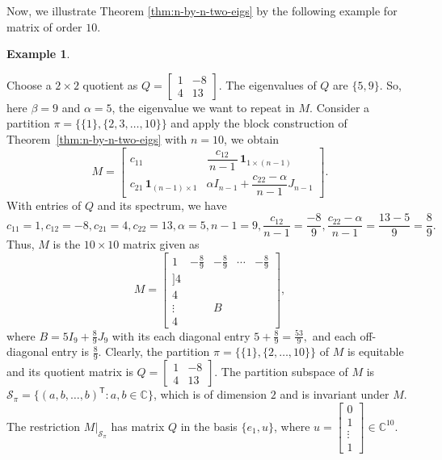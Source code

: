 \documentclass[12pt,twoside]{article}
\newtheorem{example}[theorem]{Example}
\begin{document}
Now, we illustrate Theorem \ref{thm:n-by-n-two-eigs} by the following example for matrix of order $10.$
\begin{example}\label{ex:n10-two-eigs}\end{example}
	Choose a $2\times 2$ quotient as $Q=
	\begin{bmatrix}
		1 & -8\\
		4 & 13
	\end{bmatrix}.$ The eigenvalues of $Q$ are $\{5,9\}.$ So, here $\beta=9$ and  $\alpha=5$, the eigenvalue we want to repeat in $M$.  Consider a  partition $	\pi=\bigl\{\{1\},\{2,3,\dots,10\}\bigr\}$ 	and apply the block construction of Theorem~\ref{thm:n-by-n-two-eigs} with $n=10$, we obtain
	$$
	M
	=
	\begin{bmatrix}
		c_{11} & \dfrac{c_{12}}{\,n-1\,}\,\mathbf{1}_{1\times (n-1)}\\
		c_{21}\,\mathbf{1}_{(n-1)\times 1} & \alpha I_{n-1} + \dfrac{c_{22}-\alpha}{\,n-1\,}J_{n-1}
	\end{bmatrix}.
	$$
	With entries of $Q$ and its spectrum, we have
	$$
	c_{11}=1,  c_{12}=-8,  c_{21}=4,  c_{22}=13,  \alpha=5,  n-1=9, \frac{c_{12}}{n-1} = \frac{-8}{9},
	\frac{c_{22}-\alpha}{n-1} = \frac{13-5}{9} = \frac{8}{9}.
	$$
	Thus, $M$ is the $10\times 10$ matrix given as
	$$
	M=
	\begin{bmatrix}
		1 & -\tfrac{8}{9} & -\tfrac{8}{9} & \cdots & -\tfrac{8}{9}\\]
		4 & & & & \\
		4 & & & & \\
		\vdots & & B & & \\
		4 & & & &
	\end{bmatrix},
	$$
	where  $B = 5I_9 + \frac{8}{9}J_9$  with its each diagonal entry  $5 + \frac{8}{9} = \frac{53}{9},$ and each off-diagonal entry is $\frac{8}{9}$.   Clearly, the partition $\pi=\{\{1\},\{2,\dots,10\}\}$ of $M$ is equitable and  its quotient matrix is  $Q=
	\begin{bmatrix}
		1 & -8\\
		4 & 13
	\end{bmatrix}.$  The partition subspace of $M$ is $\mathcal{S}_\pi
	=
	\{(a,b,\dots,b)^\mathsf{T}:a,b\in\mathbb{C}\}$, which is of  dimension $2$ and is invariant under $M$. The restriction $M|_{\mathcal{S}_\pi}$ has matrix $Q$ in the basis $\{e_1,u\}$, where $u=\begin{bmatrix}0\\1\\\vdots\\1\end{bmatrix}\in\mathbb{C}^{10}.$
\end{document}
